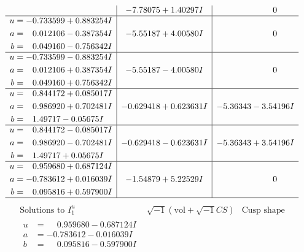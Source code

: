 \documentclass[1p]{elsarticle_modified}
\theoremstyle{definition}
\newcommand{\I}{\sqrt{-1}}
\begin{document}
$$\begin{array}{c|c|c}
 & -7.78075 + 1.40297 I & \phantom{-0.000000 } 0 \\ \hline\begin{aligned}
u &= -0.733599 + 0.883254 I \\
a &= \phantom{-}0.012106 - 0.387354 I \\
b &= \phantom{-}0.049160 - 0.756342 I\end{aligned}
 & -5.55187 + 4.00580 I & \phantom{-0.000000 } 0 \\ \hline\begin{aligned}
u &= -0.733599 - 0.883254 I \\
a &= \phantom{-}0.012106 + 0.387354 I \\
b &= \phantom{-}0.049160 + 0.756342 I\end{aligned}
 & -5.55187 - 4.00580 I & \phantom{-0.000000 } 0 \\ \hline\begin{aligned}
u &= \phantom{-}0.844172 + 0.085017 I \\
a &= \phantom{-}0.986920 + 0.702481 I \\
b &= \phantom{-}1.49717 - 0.05675 I\end{aligned}
 & -0.629418 + 0.623631 I & -5.36343 - 3.54196 I \\ \hline\begin{aligned}
u &= \phantom{-}0.844172 - 0.085017 I \\
a &= \phantom{-}0.986920 - 0.702481 I \\
b &= \phantom{-}1.49717 + 0.05675 I\end{aligned}
 & -0.629418 - 0.623631 I & -5.36343 + 3.54196 I \\ \hline\begin{aligned}
u &= \phantom{-}0.959680 + 0.687124 I \\
a &= -0.783612 + 0.016039 I \\
b &= \phantom{-}0.095816 + 0.597900 I\end{aligned}
 & -1.54879 + 5.22529 I & \phantom{-0.000000 } 0\\
 \hline 
 \end{array}$$\newpage$$\begin{array}{c|c|c}  
\text{Solutions to }I^u_{1}& \I (\text{vol} + \sqrt{-1}CS) & \text{Cusp shape}\\
 \hline 
\begin{aligned}
u &= \phantom{-}0.959680 - 0.687124 I \\
a &= -0.783612 - 0.016039 I \\
b &= \phantom{-}0.095816 - 0.597900 I\end{aligned}

\end{array}$$
\end{document}
